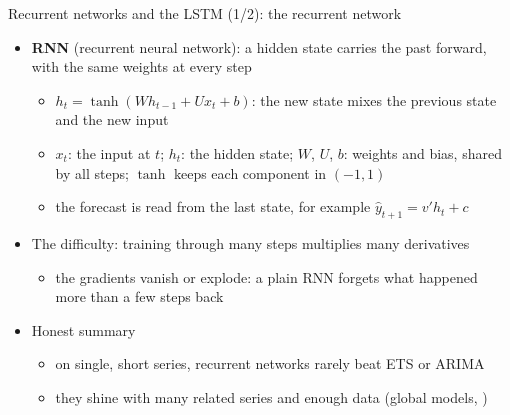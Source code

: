 \begin{frame}{Recurrent networks and the LSTM (1/2): the recurrent network}
\itemsize{\footnotesize}
\begin{itemize}
    \item \textbf{RNN} (recurrent neural network): a hidden state carries the past forward, with the same weights at every step
    \begin{itemize}
        \item $h_t = \tanh(Wh_{t-1} + Ux_t + b)$: the new state mixes the previous state and the new input
        \item $x_t$: the input at $t$; $h_t$: the hidden state; $W$, $U$, $b$: weights and bias, shared by all steps; $\tanh$ keeps each component in $(-1, 1)$
        \item the forecast is read from the last state, for example $\hat y_{t+1} = v'h_t + c$
    \end{itemize}
    \item The difficulty: training through many steps multiplies many derivatives
    \begin{itemize}
        \item the gradients vanish or explode: a plain RNN forgets what happened more than a few steps back
    \end{itemize}
    \item Honest summary 
    \begin{itemize}
        \item on single, short series, recurrent networks rarely beat ETS or ARIMA
        \item they shine with many related series and enough data (global models, )
    \end{itemize}
\end{itemize}
\end{frame}

